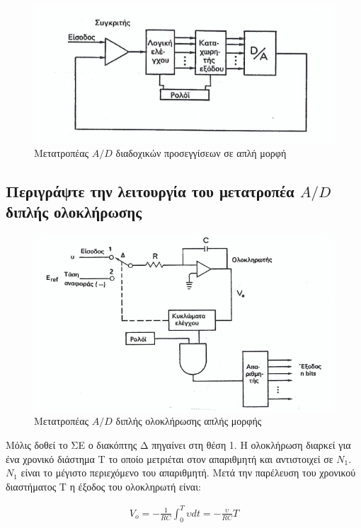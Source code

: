\documentclass{article}
\begin{document}
\begin{figure}[h!]
    \includegraphics[width=\linewidth]{metatropeasdiadoxikwnproseggisewn.png}
    \caption{Μετατροπέας $Α/D$ διαδοχικών προσεγγίσεων σε απλή μορφή}
\end{figure}

\subsection{Περιγράψτε την λειτουργία του μετατροπέα $A/D$ διπλής 
ολοκλήρωσης}

\begin{figure}[h!]
    \includegraphics[width=\linewidth]{AD2olok.png}
    \caption{Μετατροπέας $A/D$ διπλής ολοκλήρωσης απλής μορφής}
\end{figure}
Μόλις δοθεί το ΣΕ ο διακόπτης Δ πηγαίνει στη θέση 1. Η ολοκλήρωση διαρκεί για ένα χρονικό διάστημα Τ το οποίο μετριέται στον απαριθμητή και αντιστοιχεί σε $Ν_1$. $Ν_1$ είναι το μέγιστο 
περιεχόμενο του απαριθμητή. Μετά την παρέλευση του χρονικού διαστήματος Τ η έξοδος του ολοκληρωτή είναι: 

\begin{align*}
    V_o=-\frac{1}{RC}\int^{T}_{0} \upsilon dt=-\frac{\upsilon}{RC}T
\end{align*}
\end{document}
